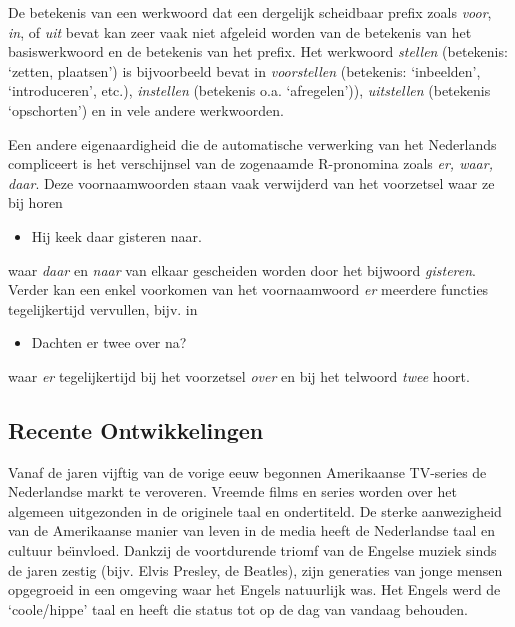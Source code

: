 \documentclass[]{../../metanetpaper}
\begin{document}
\begin{multicols}{2}
    De betekenis van een werkwoord dat een dergelijk scheidbaar prefix zoals \emph{voor}, \emph{in}, of \emph{uit} bevat kan zeer vaak niet afgeleid worden van de betekenis van het basiswerkwoord en de betekenis van het prefix. Het werkwoord \emph{stellen} (betekenis: `zetten, plaatsen') is bijvoorbeeld bevat in \emph{voorstellen} (betekenis: `inbeelden', `introduceren', etc.), \emph{instellen} (betekenis o.a. `afregelen')), \emph{uitstellen} (betekenis `opschorten') en in vele andere werkwoorden.


    Een andere eigenaardigheid die de automatische verwerking van het Nederlands compliceert is het verschijnsel van de zogenaamde R-pronomina zoals \emph{er, waar, daar}. Deze voornaamwoorden staan vaak verwijderd van het voorzetsel waar ze bij horen

\begin{itemize}
\item Hij keek daar gisteren naar.
\end{itemize}

    waar \textit{daar} en \textit{naar} van elkaar gescheiden worden door het bijwoord \textit{gisteren}. Verder kan een enkel voorkomen van het voornaamwoord \emph{er} meerdere functies tegelijkertijd vervullen, bijv. in

\begin{itemize}
\item Dachten er twee over na?
\end{itemize}

    waar \emph{er} tegelijkertijd bij het voorzetsel \emph{over} en bij het telwoord \emph{twee} hoort.


\subsection{Recente Ont\-wikke\-lin\-gen}

    Vanaf de jaren vijftig van de vorige eeuw begonnen Amerikaanse TV-series de Nederlandse markt te veroveren. Vreemde films en series worden over het algemeen uitgezonden in de originele taal en ondertiteld. De sterke aanwezigheid van de Amerikaanse manier van leven in de media heeft de Nederlandse taal en cultuur be{\"\i}nvloed. Dankzij de voortdurende triomf van de Engelse muziek sinds de jaren zestig (bijv. Elvis Presley, de Beatles), zijn generaties van jonge mensen opgegroeid in een omgeving waar het Engels natuurlijk was. Het Engels werd de `coole/hippe' taal en heeft die status tot op de dag van vandaag behouden.


\end{multicols}
\end{document}

